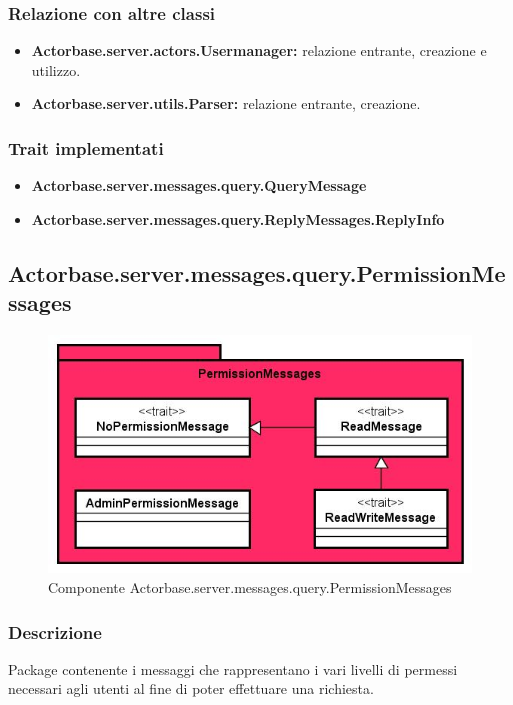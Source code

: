 \documentclass[a4paper]{article}
\begin{document}
			\subsubsection{Relazione con altre classi}
				\begin{itemize}
					\item \textbf{Actorbase.server.actors.Usermanager:} relazione entrante, creazione e utilizzo.
					\item \textbf{Actorbase.server.utils.Parser:} relazione entrante, creazione.
				\end{itemize}
			
			\subsubsection{Trait implementati}
				\begin{itemize}
					\item \textbf{Actorbase.server.messages.query.QueryMessage}
					\item \textbf{Actorbase.server.messages.query.ReplyMessages.ReplyInfo} 
				\end{itemize}

		\subsection{Actorbase.server.messages.query.PermissionMessages}
		
			\begin{figure}[H]
				\centering
				\includegraphics[scale = 0.6]{ST/Server/permissionMessagesLevel}
				\caption{Componente Actorbase.server.messages.query.PermissionMessages}
			\end{figure}
			
			\subsubsection{Descrizione}
				Package contenente i messaggi che rappresentano i vari livelli di permessi necessari agli utenti al fine di poter 
				effettuare una richiesta.
				
\end{document}
